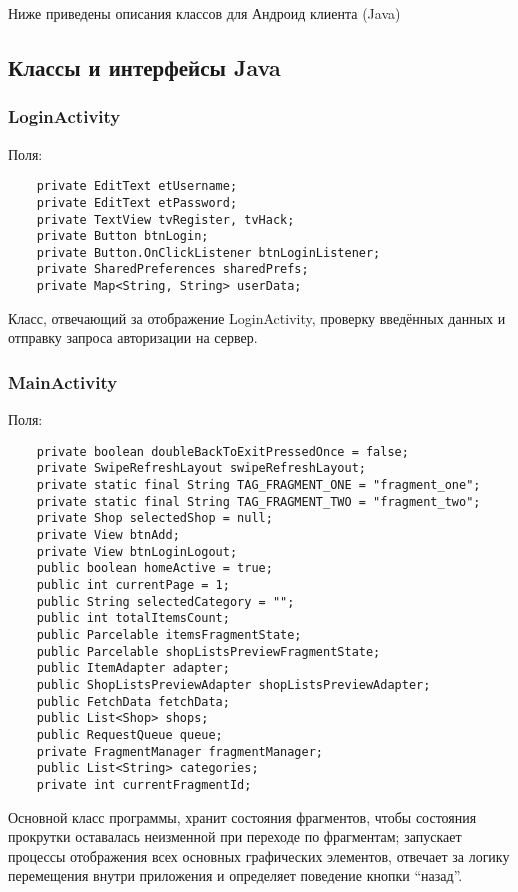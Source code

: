 Ниже приведены описания классов для Андроид клиента (Java)

\subsection{Классы и интерфейсы Java}

\subsubsection{LoginActivity}
Поля:\\
\begin{small}
    \begin{verbatim}
    private EditText etUsername;
    private EditText etPassword;
    private TextView tvRegister, tvHack;
    private Button btnLogin;
    private Button.OnClickListener btnLoginListener;
    private SharedPreferences sharedPrefs;
    private Map<String, String> userData;
    \end{verbatim}
\end{small}
Класс, отвечающий за отображение LoginActivity, проверку введённых данных и отправку запроса авторизации на сервер.

\subsubsection{MainActivity}
Поля:\\
\begin{small}
    \begin{verbatim}
    private boolean doubleBackToExitPressedOnce = false;
    private SwipeRefreshLayout swipeRefreshLayout;
    private static final String TAG_FRAGMENT_ONE = "fragment_one";
    private static final String TAG_FRAGMENT_TWO = "fragment_two";
    private Shop selectedShop = null;
    private View btnAdd;
    private View btnLoginLogout;
    public boolean homeActive = true;
    public int currentPage = 1;
    public String selectedCategory = "";
    public int totalItemsCount;
    public Parcelable itemsFragmentState;
    public Parcelable shopListsPreviewFragmentState;
    public ItemAdapter adapter;
    public ShopListsPreviewAdapter shopListsPreviewAdapter;
    public FetchData fetchData;
    public List<Shop> shops;
    public RequestQueue queue;
    private FragmentManager fragmentManager;
    public List<String> categories;
    private int currentFragmentId;
    \end{verbatim}
\end{small}
Основной класс программы, хранит состояния фрагментов, чтобы состояния прокрутки оставалась неизменной при переходе по фрагментам; запускает процессы отображения всех основных графических элементов, отвечает за логику перемещения внутри приложения и определяет поведение кнопки ``назад''.
